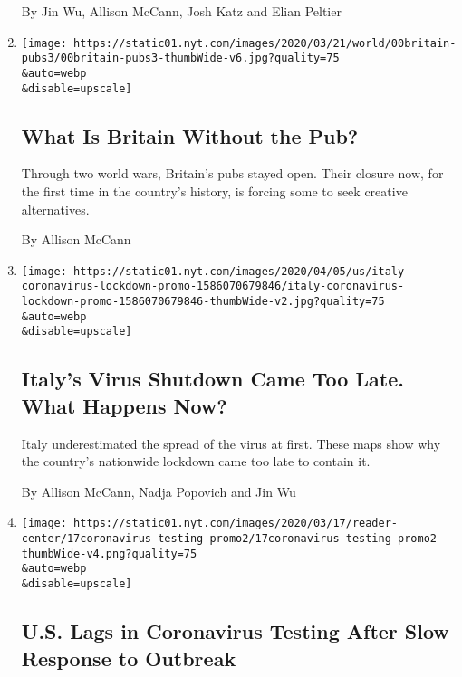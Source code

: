 \begin{enumerate}
  By Jin Wu, Allison McCann, Josh Katz and Elian Peltier
\item
  \href{/2020/04/09/world/europe/uk-pub-coronavirus.html}{}

  \texttt{[image: https://static01.nyt.com/images/2020/03/21/world/00britain-pubs3/00britain-pubs3-thumbWide-v6.jpg?quality=75\\\&auto=webp\\\&disable=upscale]}

  \hypertarget{what-is-britain-without-the-pub}{%
  \subsection{What Is Britain Without the
  Pub?}\label{what-is-britain-without-the-pub}}

  Through two world wars, Britain's pubs stayed open. Their closure now,
  for the first time in the country's history, is forcing some to seek
  creative alternatives.

  By Allison McCann
\item
  \href{/interactive/2020/04/05/world/europe/italy-coronavirus-lockdown-reopen.html}{}

  \texttt{[image: https://static01.nyt.com/images/2020/04/05/us/italy-coronavirus-lockdown-promo-1586070679846/italy-coronavirus-lockdown-promo-1586070679846-thumbWide-v2.jpg?quality=75\\\&auto=webp\\\&disable=upscale]}

  \hypertarget{italys-virus-shutdown-came-too-late-what-happens-now}{%
  \subsection{Italy's Virus Shutdown Came Too Late. What Happens
  Now?}\label{italys-virus-shutdown-came-too-late-what-happens-now}}

  Italy underestimated the spread of the virus at first. These maps show
  why the country's nationwide lockdown came too late to contain it.

  By Allison McCann, Nadja Popovich and Jin Wu
\item
  \href{/interactive/2020/03/17/us/coronavirus-testing-data.html}{}

  \texttt{[image: https://static01.nyt.com/images/2020/03/17/reader-center/17coronavirus-testing-promo2/17coronavirus-testing-promo2-thumbWide-v4.png?quality=75\\\&auto=webp\\\&disable=upscale]}

  \hypertarget{us-lags-in-coronavirus-testing-after-slow-response-to-outbreak}{%
  \subsection{U.S. Lags in Coronavirus Testing After Slow Response to
  Outbreak}\label{us-lags-in-coronavirus-testing-after-slow-response-to-outbreak}}


\end{enumerate}
